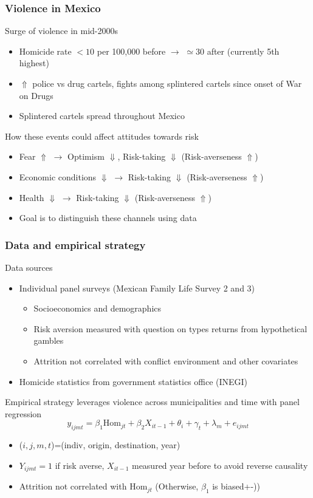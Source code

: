 \documentclass[aspectratio=169]{beamer}
\begin{document}
\begin{frame}
\frametitle{Violence in Mexico} 
Surge of violence in mid-2000s
\begin{itemize}\setlength\itemsep{3pt}
\item Homicide rate $<10$ per 100,000 before $\to$ $\simeq30$ after (currently 5th highest)
\item $\Uparrow$ police vs drug cartels, fights among splintered cartels since onset of War on Drugs
\item Splintered cartels spread throughout Mexico
\end{itemize} \medskip
How these events could affect attitudes towards risk
\begin{itemize}\setlength\itemsep{3pt}
\item Fear $\Uparrow$ $\to$ Optimism $\Downarrow$, Risk-taking $\Downarrow$ (Risk-averseness $\Uparrow$)
\item Economic conditions $\Downarrow$ $\to$ Risk-taking $\Downarrow$ (Risk-averseness $\Uparrow$)
\item Health $\Downarrow$ $\to$ Risk-taking $\Downarrow$ (Risk-averseness $\Uparrow$)
\item[$\to$] Goal is to distinguish these channels using data
\end{itemize}
\end{frame}

\begin{frame}
\frametitle{Data and empirical strategy} 
Data sources
\begin{itemize}\setlength\itemsep{3pt}
\item Individual panel surveys (Mexican Family Life Survey 2 and 3)
\begin{itemize}\setlength\itemsep{3pt}
  \item Socioeconomics and demographics
  \item Risk aversion measured with question on types returns from hypothetical gambles
  \item Attrition not correlated with conflict environment and other covariates
  \end{itemize}
\item Homicide statistics from government statistics office (INEGI)
\end{itemize} \medskip
Empirical strategy leverages violence across municipalities and time with panel regression
\[
y_{ijmt}=\beta_1 \text{Hom}_{jt}+\beta_2 X_{it-1}+\theta_i+\gamma_t + \lambda_m+e_{ijmt}
\]
\vspace{-10pt}
\begin{itemize}\setlength\itemsep{3pt}
  \item ($i,j,m,t$)=(indiv, origin, destination, year)
  \item $Y_{ijmt}=1$ if risk averse, $X_{it-1}$ measured year before to avoid reverse causality
  \item Attrition not correlated with $\text{Hom}_{jt}$ (Otherwise, $\beta_1$ is biased+-))
  \end{itemize}

\end{frame}
\end{document}

